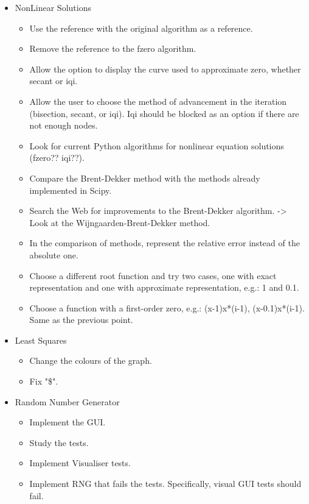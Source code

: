\begin{itemize}
\item NonLinear Solutions
\begin{itemize}
    \item Use the reference with the original algorithm as a reference.
    \item Remove the reference to the fzero algorithm.
    \item Allow the option to display the curve used to approximate zero, whether secant or iqi.
    \item Allow the user to choose the method of advancement in the iteration (bisection, secant, or iqi). Iqi should be blocked as an option if there are not enough nodes.
    \item Look for current Python algorithms for nonlinear equation solutions (fzero?? iqi??).
    \item Compare the Brent-Dekker method with the methods already implemented in Scipy.
    \item Search the Web for improvements to the Brent-Dekker algorithm. -> Look at the Wijngaarden-Brent-Dekker method.
    \item In the comparison of methods, represent the relative error instead of the absolute one.
    \item Choose a different root function and try two cases, one with exact representation and one with approximate representation, e.g.: 1 and 0.1.
    \item Choose a function with a first-order zero, e.g.: (x-1)x*(i-1), (x-0.1)x*(i-1). Same as the previous point.
\end{itemize}

\item Least Squares
\begin{itemize}
    \item Change the colours of the graph.
    \item Fix "\$".
\end{itemize}

\item Random Number Generator
\begin{itemize}
    \item Implement the GUI.
    \item Study the tests.
    \item Implement Visualiser tests.
    \item Implement RNG that fails the tests. Specifically, visual GUI tests should fail.
\end{itemize}
\end{itemize}